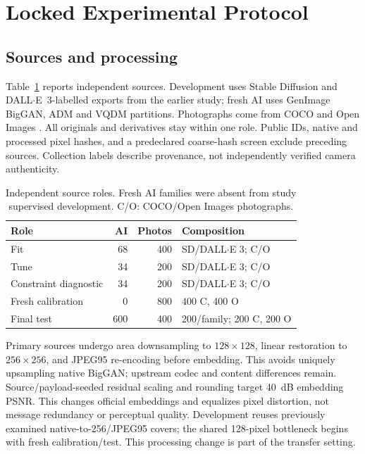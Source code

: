 \documentclass[conference]{IEEEtran}
\begin{document}
\section{Locked Experimental Protocol}
\subsection{Sources and processing}
Table~\ref{tab:roles} reports independent sources. Development uses Stable
Diffusion and DALL$\cdot$E~3-labelled exports from the earlier study; fresh AI
uses GenImage BigGAN, ADM and VQDM partitions.
Photographs come from COCO \cite{coco} and Open Images \cite{openimages}.
All originals and derivatives stay within one role. Public IDs, native and
processed pixel hashes, and a predeclared coarse-hash screen exclude preceding
sources. Collection labels describe provenance, not independently verified
camera authenticity.

\begin{table}[t]
\caption{Independent source roles. Fresh AI families were absent from study
supervised development. C/O: COCO/Open Images photographs.}
\label{tab:roles}\centering\footnotesize\setlength{\tabcolsep}{3.6pt}
\begin{tabular}{lrrl}\toprule
Role & AI & Photos & Composition\\\midrule
Fit & 68 & 400 & SD/DALL$\cdot$E 3; C/O\\
Tune & 34 & 200 & SD/DALL$\cdot$E 3; C/O\\
Constraint diagnostic & 34 & 200 & SD/DALL$\cdot$E 3; C/O\\
Fresh calibration & 0 & 800 & 400 C, 400 O\\
Final test & 600 & 400 & 200/family; 200 C, 200 O\\
\bottomrule\end{tabular}\end{table}

Primary sources undergo area downsampling to $128\times128$, linear restoration
to $256\times256$, and JPEG95 re-encoding before embedding.
This avoids uniquely upsampling native BigGAN; upstream codec and content
differences remain. Source/payload-seeded residual scaling and rounding target
40~dB embedding PSNR. This changes official embeddings and equalizes pixel
distortion, not message redundancy or perceptual quality.
Development reuses previously examined native-to-256/JPEG95 covers; the shared
128-pixel bottleneck begins with fresh calibration/test. This processing change
is part of the transfer setting.
\end{document}

